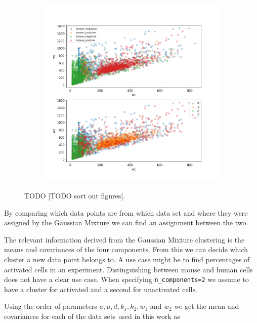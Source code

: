 \begin{figure}
\begin{subfigure}{0.3\textwidth}
	\end{subfigure}
	\hfill
	\begin{subfigure}{0.3\textwidth}
		\includegraphics[width=\textwidth]{fig/seperate_w1_w2}
	\end{subfigure}
	
	\caption{TODO [TODO sort out figures].}
	\label{fig:vis_output_seperate}
\end{figure}

By comparing which data points are from which data set and where they were assigned by the Gaussian Mixture we can find an assignment between the two.

\newpage

The relevant information derived from the Gaussian Mixture clustering is the means and covariances of the four components. From this we can decide which cluster a new data point belongs to. A use case might be to find percentages of activated cells in an experiment. Distinguishing between mouse and human cells does not have a clear use case. When specifying \texttt{n\_components=2} we assume to have a cluster for activated and a second for unactivated cells.

Using the order of parameters $a, u, d, k_1, k_2, w_1$ and $w_2$ we get the mean and covariances for each of the data sets used in this work as 

